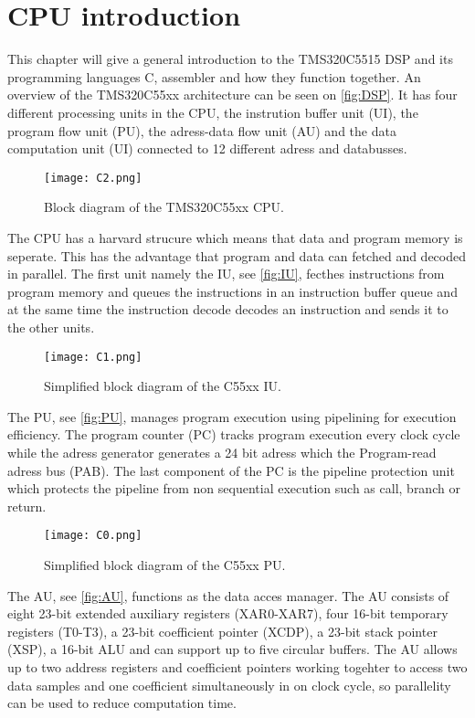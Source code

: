\chapter{CPU introduction}
This chapter will give a general introduction to the TMS320C5515 DSP and its programming languages C, assembler and how they function together. An overview of the TMS320C55xx architecture can be seen on \autoref{fig:DSP}. It has four different processing units in the CPU, the instrution buffer unit (UI), the program flow unit (PU), the adress-data flow unit (AU) and the data computation unit (UI) connected to 12 different adress and databusses.  
\begin{figure}[H]
\centering
\texttt{[image: C2.png]}
\label{fig:DSP}
\caption{Block diagram of the TMS320C55xx CPU.}
\end{figure}
The CPU has a harvard strucure which means that data and program memory is seperate. This has the advantage that program and data can fetched and decoded in parallel. The first unit namely the IU, see \autoref{fig:IU}, fecthes instructions from program memory and queues the instructions in an instruction buffer queue and at the same time the instruction decode decodes an instruction and sends it to the other units.
\begin{figure}[H]
\centering
\texttt{[image: C1.png]}
\label{fig:IU}
\caption{Simplified block diagram of the C55xx IU.}
\end{figure}
The PU, see \autoref{fig:PU}, manages program execution using pipelining for execution efficiency. The program counter (PC) tracks program execution every clock cycle while the adress generator generates a 24 bit adress which the Program-read adress bus (PAB). The last component of the PC is the pipeline protection unit which protects the pipeline from non sequential execution such as call, branch or return.
\begin{figure}[H]
\centering
\texttt{[image: C0.png]}
\label{fig:PU}
\caption{Simplified block diagram of the C55xx PU.}
\end{figure}
The AU, see \autoref{fig:AU}, functions as the data acces manager. The AU consists of eight 23-bit extended auxiliary registers (XAR0-XAR7), four 16-bit temporary registers (T0-T3), a 23-bit coefficient pointer (XCDP), a 23-bit stack pointer (XSP), a 16-bit ALU and can support up to five circular buffers. The AU allows up to two address registers and coefficient pointers working togehter to access two data samples and one coefficient simultaneously in on clock cycle, so parallelity can be used to reduce computation time. 
